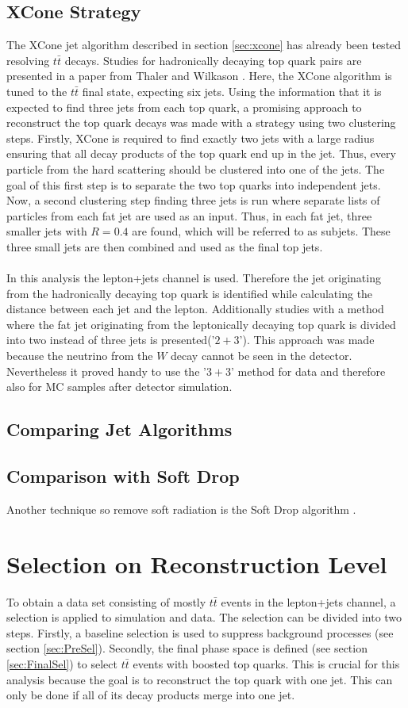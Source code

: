 \subsection{XCone Strategy}
\label{sec:XCone_strat}
	The XCone jet algorithm described in section \ref{sec:xcone} has already been tested resolving $t\bar{t}$ decays. Studies for hadronically decaying top quark pairs are presented in a paper from Thaler and Wilkason \cite{xconetop}. Here, the XCone algorithm is tuned to the $t\bar{t}$ final state, expecting six jets. Using the information that it is expected to find three jets from each top quark, a promising approach to reconstruct the top quark decays was made with a strategy using two clustering steps. Firstly, XCone is required to find exactly two jets with a large radius ensuring that all decay products of the top quark end up in the jet. Thus, every particle from the hard scattering should be clustered into one of the jets. The goal of this first step is to separate the two top quarks into independent jets. Now, a second clustering step finding three jets is run where separate lists of particles from each fat jet are used as an input. Thus, in each fat jet, three smaller jets with $R=0.4$ are found, which will be referred to as subjets. These three small jets are then combined and used as the final top jets. \\
	\\ In this analysis the lepton+jets channel is used. Therefore the jet originating from the hadronically decaying top quark is identified while calculating the distance between each jet and the lepton. Additionally studies with a method where the fat jet originating from the leptonically decaying top quark is divided into two instead of three jets is presented('$2+3$'). This approach was made because the neutrino from the $W$ decay cannot be seen in the detector. Nevertheless it proved handy to use the '$3+3$' method for data and therefore also for MC samples after detector simulation.   
\subsection{Comparing Jet Algorithms}
\subsection{Comparison with Soft Drop}
	Another technique so remove soft radiation is the Soft Drop algorithm \cite{softdrop}.
\section{Selection on Reconstruction Level}
\label{sec:selection}
	To obtain a data set consisting of mostly $t\bar{t}$ events in the lepton+jets channel, a selection is applied to simulation and data. The selection can be divided into two steps. Firstly, a baseline selection is used to suppress background processes (see section \ref{sec:PreSel}). Secondly, the final phase space is defined (see section \ref{sec:FinalSel}) to select $t\bar{t}$ events with boosted top quarks. This is crucial for this analysis because the goal is to reconstruct the top quark with one jet. This can only be done if all of its decay products merge into one jet.
